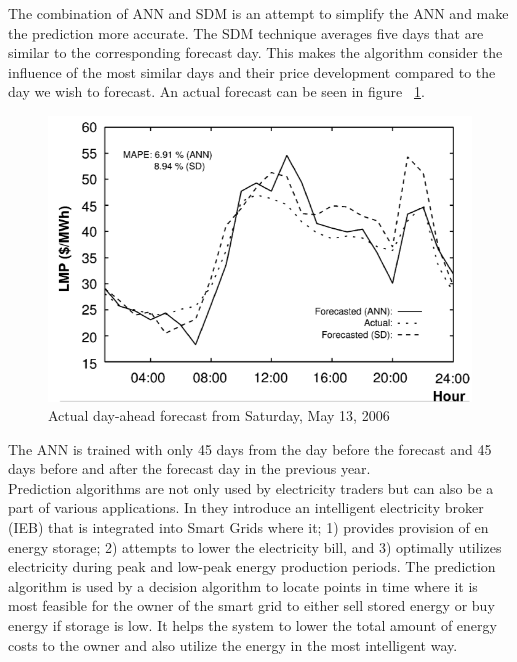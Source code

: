 The combination of ANN and SDM is an attempt to simplify the ANN and make the prediction more accurate. The SDM technique averages five days that are similar to the corresponding forecast day. This makes the algorithm consider the influence of the most similar days and their price development compared to the day we wish to forecast. An actual forecast can be seen in figure ~\ref{fig:actualForecastMay13}.
\begin{figure}[h!]
\centering
\includegraphics[width=0.8\linewidth,natwidth=898,natheight=587]{billeder/SDMANNAccuracy.png}
\caption{Actual day-ahead forecast from Saturday, May 13, 2006 \cite{pjmForecast}}
\label{fig:actualForecastMay13}
\end{figure}
The ANN is trained with only 45 days from the day before the forecast and 45 days before and after the forecast day in the previous year.
\\[0.5cm]
Prediction algorithms are not only used by electricity traders but can also be a part of various applications. In \cite{22} they introduce an intelligent electricity broker (IEB) that is integrated into Smart Grids where it; 1) provides provision of en energy storage; 2) attempts to lower the electricity bill, and 3) optimally utilizes electricity during peak and low-peak energy production periods. The prediction algorithm is used by a decision algorithm to locate points in time where it is most feasible for the owner of the smart grid to either sell stored energy or buy energy if storage is low. It helps the system to lower the total amount of energy costs to the owner and also utilize the energy in the most intelligent way.
 